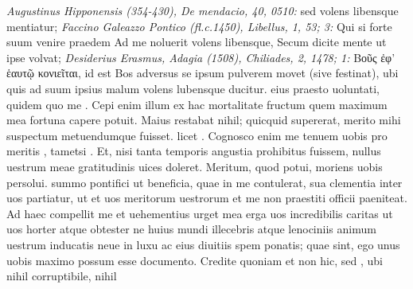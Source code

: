 \documentclass[a5paper,twoside]{article}
\begin{document}
\begin{pages}
\begin{Leftside}
{{\textit{Augustinus Hipponensis (354-430), De mendacio, 40, 0510:} sed volens libensque mentiatur; 
\textit{Faccino Galeazzo Pontico (fl.c.1450), Libellus, 1, 53; 3:} Qui si forte suum venire praedem Ad me noluerit volens libensque, Secum dicite mente ut ipse volvat; 
\textit{Desiderius Erasmus, Adagia (1508), Chiliades, 2, 1478; 1:} \textgreek{Βοῦς ἐφ' ἑαυτῷ κονιεῖται}, id est Bos adversus se ipsum pulverem movet (sive festinat), ubi quis ad suum ipsius malum volens lubensque ducitur.}}  
eius praesto  uoluntati,  quidem  quo me .  Cepi enim illum ex hac mortalitate fructum quem maximum mea fortuna capere potuit.  Maius restabat nihil; quicquid supererat, merito mihi suspectum metuendumque fuisset.   licet .  Cognosco enim me tenuem uobis  pro meritis , tametsi .  Et, nisi tanta temporis angustia prohibitus fuissem, nullus uestrum meae gratitudinis uices doleret.  Meritum, quod potui, moriens uobis persolui.   summo pontifici ut beneficia, quae in me contulerat, sua clementia inter uos partiatur, ut et uos meritorum uestrorum et me non praestiti officii  paeniteat.  Ad haec compellit me et uehementius urget mea erga uos incredibilis caritas ut uos horter atque obtester ne huius mundi illecebris atque lenociniis animum uestrum inducatis neue in luxu ac  eius diuitiis spem  ponatis; quae  sint, ego unus uobis maximo possum esse documento.  Credite quoniam  et non hic, sed , ubi nihil corruptibile, nihil 
\end{Leftside}
\end{pages}
\end{document}
